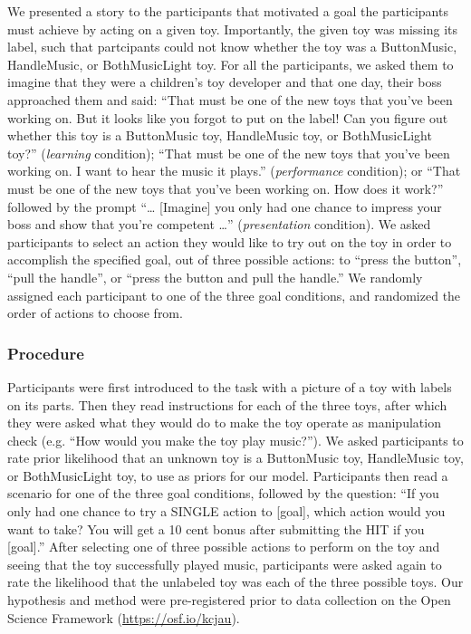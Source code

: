 \documentclass[10pt, letterpaper]{article}
\begin{document}
We presented a story to the participants that motivated a goal the
participants must achieve by acting on a given toy. Importantly, the
given toy was missing its label, such that partcipants could not know
whether the toy was a ButtonMusic, HandleMusic, or BothMusicLight toy.
For all the participants, we asked them to imagine that they were a
children's toy developer and that one day, their boss approached them
and said: ``That must be one of the new toys that you've been working
on. But it looks like you forgot to put on the label! Can you figure out
whether this toy is a ButtonMusic toy, HandleMusic toy, or
BothMusicLight toy?'' (\emph{learning} condition); ``That must be one of
the new toys that you've been working on. I want to hear the music it
plays.'' (\emph{performance} condition); or ``That must be one of the
new toys that you've been working on. How does it work?'' followed by
the prompt ``\ldots{} {[}Imagine{]} you only had one chance to impress
your boss and show that you're competent \ldots{}'' (\emph{presentation}
condition). We asked participants to select an action they would like to
try out on the toy in order to accomplish the specified goal, out of
three possible actions: to ``press the button'', ``pull the handle'', or
``press the button and pull the handle.'' We randomly assigned each
participant to one of the three goal conditions, and randomized the
order of actions to choose from.

\subsubsection{Procedure}\label{procedure}

Participants were first introduced to the task with a picture of a toy
with labels on its parts. Then they read instructions for each of the
three toys, after which they were asked what they would do to make the
toy operate as manipulation check (e.g. ``How would you make the toy
play music?''). We asked participants to rate prior likelihood that an
unknown toy is a ButtonMusic toy, HandleMusic toy, or BothMusicLight
toy, to use as priors for our model. Participants then read a scenario
for one of the three goal conditions, followed by the question: ``If you
only had one chance to try a SINGLE action to {[}goal{]}, which action
would you want to take? You will get a 10 cent bonus after submitting
the HIT if you {[}goal{]}.'' After selecting one of three possible
actions to perform on the toy and seeing that the toy successfully
played music, participants were asked again to rate the likelihood that
the unlabeled toy was each of the three possible toys. Our hypothesis
and method were pre-registered prior to data collection on the Open
Science Framework (\url{https://osf.io/kcjau}).
\end{document}
